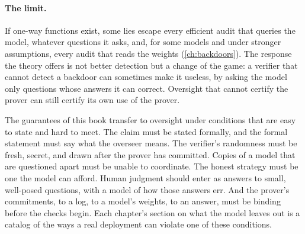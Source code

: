 \begin{refsection}
\paragraph{The limit.} If one-way functions exist, some lies escape every efficient audit that queries the model, whatever questions it asks, and, for some models and under stronger assumptions, every audit that reads the weights (\cref{ch:backdoors}). The response the theory offers is not better detection but a change of the game: a verifier that cannot detect a backdoor can sometimes make it useless, by asking the model only questions whose answers it can correct. Oversight that cannot certify the prover can still certify its own use of the prover.


The guarantees of this book transfer to oversight under conditions that are easy to state and hard to meet. The claim must be stated formally, and the formal statement must say what the overseer means. The verifier's randomness must be fresh, secret, and drawn after the prover has committed. Copies of a model that are questioned apart must be unable to coordinate. The honest strategy must be one the model can afford. Human judgment should enter as answers to small, well-posed questions, with a model of how those answers err. And the prover's commitments, to a log, to a model's weights, to an answer, must be binding before the checks begin. Each chapter's section on what the model leaves out is a catalog of the ways a real deployment can violate one of these conditions.



\end{refsection}
